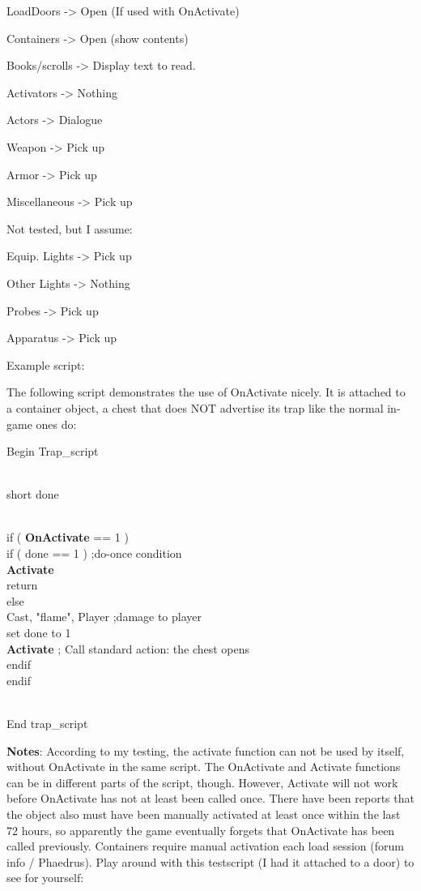 \documentclass[
]{article}
\begin{document}
LoadDoors -\textgreater{} Open (If used with OnActivate)

Containers -\textgreater{} Open (show contents)

Books/scrolls -\textgreater{} Display text to read.

Activators -\textgreater{} Nothing

Actors -\textgreater{} Dialogue

Weapon -\textgreater{} Pick up

Armor -\textgreater{} Pick up

Miscellaneous -\textgreater{} Pick up

Not tested, but I assume:

Equip. Lights -\textgreater{} Pick up

Other Lights -\textgreater{} Nothing

Probes -\textgreater{} Pick up

Apparatus -\textgreater{} Pick up

Example script:

The following script demonstrates the use of OnActivate nicely. It is
attached to a container object, a chest that does NOT advertise its trap
like the normal in-game ones do:

Begin Trap\_script\\
\strut \\
short done\\
\strut \\
if ( \textbf{OnActivate} == 1 )\\
if ( done == 1 ) ;do-once condition\\
\textbf{Activate}\\
return\\
else\\
Cast, "flame", Player ;damage to player\\
set done to 1\\
\textbf{Activate} ; Call standard action: the chest opens\\
endif\\
endif\\
\strut \\
End trap\_script

\textbf{Notes}: According to my testing, the activate function can not
be used by itself, without OnActivate in the same script. The OnActivate
and Activate functions can be in different parts of the script, though.
However, Activate will not work before OnActivate has not at least been
called once. There have been reports that the object also must have been
manually activated at least once within the last 72 hours, so apparently
the game eventually forgets that OnActivate has been called previously.
Containers require manual activation each load session (forum info /
Phaedrus). Play around with this testscript (I had it attached to a
door) to see for yourself:
\end{document}
